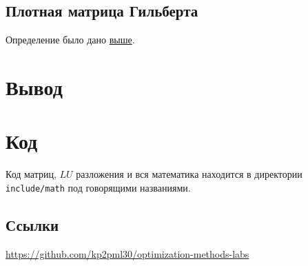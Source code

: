 \documentclass[russian, english]{article}
\begin{document}
\subsection{Плотная матрица Гильберта}
Определение было дано \hyperref[Hilbert]{выше}.\\

\section{Вывод}

\newpage
\appendix
\section{Код}
Код матриц, $LU$ разложения и вся математика находится в директории \texttt{include/math} под говорящими названиями.
\subsection{Ссылки}
\url{https://github.com/kp2pml30/optimization-methods-labs}
\end{document}
